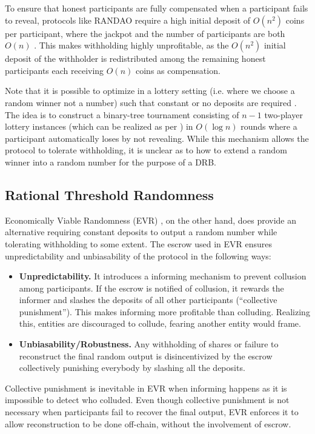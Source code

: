 \documentclass[letterpaper,twocolumn,10pt]{article}
\theoremstyle{definition}
\theoremstyle{remark}
\begin{document}
To ensure that honest participants are fully compensated when a participant fails to reveal, protocols like RANDAO require a high initial deposit of $O(n^2)$ coins per participant, where the jackpot and the number of participants are both $O(n)$ \cite{andrychowicz2014secure, bentov2014use}. This makes withholding highly unprofitable, as the $O(n^2)$ initial deposit of the withholder is redistributed among the remaining honest participants each receiving $O(n)$ coins as compensation.

Note that it is possible to optimize in a lottery setting (i.e. where we choose a random winner not a number) such that constant or no deposits are required \cite{bartoletti2017constant, miller2017zero}. The idea is to construct a binary-tree tournament consisting of $n - 1$ two-player lottery instances (which can be realized as per \cite{andrychowicz2014fair, andrychowicz2014secure}) in $O(\log n)$ rounds where a participant automatically loses by not revealing. While this mechanism allows the protocol to tolerate withholding, it is unclear as to how to extend a random winner into a random number for the purpose of a DRB.

\subsection{Rational Threshold Randomness}
Economically Viable Randomness (EVR) \cite{david2020economically}, on the other hand, does provide an alternative requiring constant deposits to output a random number while tolerating withholding to some extent. The escrow used in EVR ensures unpredictability and unbiasability of the protocol in the following ways:
\begin{itemize}
    \item \textbf{Unpredictability.} It introduces a informing mechanism to prevent collusion among participants. If the escrow is notified of collusion, it rewards the informer and slashes the deposits of all other participants (``collective punishment''). This makes informing more profitable than colluding. Realizing this, entities are discouraged to collude, fearing another entity would frame.
    \item \textbf{Unbiasability/Robustness.} Any withholding of shares or failure to reconstruct the final random output is disincentivized by the escrow collectively punishing everybody by slashing all the deposits.
\end{itemize}

Collective punishment is inevitable in EVR when informing happens as it is impossible to detect who colluded. Even though collective punishment is not necessary when participants fail to recover the final output, EVR enforces it to allow reconstruction to be done off-chain, without the involvement of escrow. 
\end{document}
